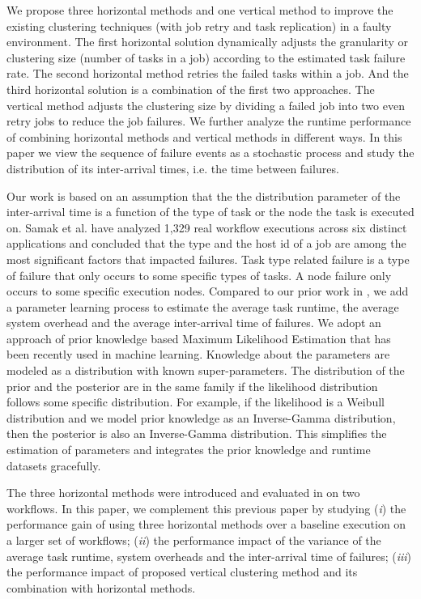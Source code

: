 \documentclass{IOS-Book-Article}
\begin{document}
We propose three horizontal methods and one vertical method to improve the existing clustering techniques (with job retry and task replication) in a faulty environment. The first horizontal solution dynamically adjusts the granularity or clustering size (number of tasks in a job) according to the estimated  task failure rate. The second horizontal method retries the failed tasks within a job. And the third horizontal solution is a combination of the first two approaches. The vertical method adjusts the clustering size by dividing a failed job into two even retry jobs to reduce the job failures. We further analyze the runtime performance of combining horizontal methods and vertical methods in different ways. 
In this paper we view the sequence of failure events as a stochastic process and study the distribution of its inter-arrival times, i.e. the time between failures. 

Our work is based on an assumption that the the distribution parameter of the inter-arrival time is a function of the type of task or the node the task is executed on. Samak \cite{Samak2011} et al. have analyzed 1,329 real workflow executions across six distinct applications and concluded that the type and the host id of a job are among the most significant factors that impacted failures. Task type related failure is a type of failure that only occurs to some specific types of tasks. A node failure only occurs to some specific execution nodes. Compared to our prior work in \cite{Chen2012}, we add a parameter learning process to estimate the average task runtime, the average system overhead and the average inter-arrival time of failures. We adopt an approach of prior knowledge based Maximum Likelihood Estimation that has been recently used in machine learning. Knowledge about the parameters are modeled as a distribution with known super-parameters. The distribution of the prior and the posterior are in the same family if the likelihood distribution follows some specific distribution. For example, if the likelihood is a Weibull distribution and we model prior knowledge as an Inverse-Gamma distribution, then the posterior is also an Inverse-Gamma distribution. This simplifies the estimation of parameters and integrates the prior knowledge and runtime datasets gracefully. 

The three horizontal methods were introduced and evaluated in \cite{Chen2012} on two workflows. In this paper, we complement this previous paper by studying (\emph{i}) the performance gain of using three horizontal methods over a baseline execution on a larger set of workflows; (\emph{ii}) the performance impact of the variance of the average task runtime, system overheads and the inter-arrival time of failures; (\emph{iii}) the performance impact of proposed vertical clustering method and its combination with horizontal methods. 
\end{document}
